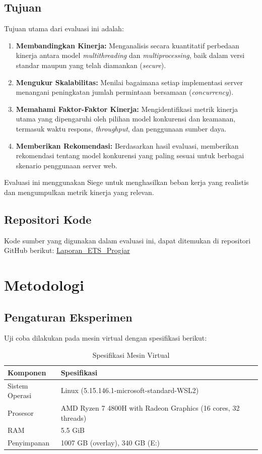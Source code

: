 \documentclass[12pt]{article}
\begin{document}
\subsection{Tujuan}

Tujuan utama dari evaluasi ini adalah:

\begin{enumerate}
    \item \textbf{Membandingkan Kinerja:} Menganalisis secara kuantitatif perbedaan kinerja antara model \textit{multithreading} dan \textit{multiprocessing}, baik dalam versi standar maupun yang telah diamankan (\textit{secure}).
    \item \textbf{Mengukur Skalabilitas:} Menilai bagaimana setiap implementasi server menangani peningkatan jumlah permintaan bersamaan (\textit{concurrency}).
    \item \textbf{Memahami Faktor-Faktor Kinerja:} Mengidentifikasi metrik kinerja utama yang dipengaruhi oleh pilihan model konkurensi dan keamanan, termasuk waktu respons, \textit{throughput}, dan penggunaan sumber daya.
    \item \textbf{Memberikan Rekomendasi:} Berdasarkan hasil evaluasi, memberikan rekomendasi tentang model konkurensi yang paling sesuai untuk berbagai skenario penggunaan server web.
\end{enumerate}

Evaluasi ini menggunakan Siege untuk menghasilkan beban kerja yang realistis dan mengumpulkan metrik kinerja yang relevan.

\subsection{Repositori Kode}

Kode sumber yang digunakan dalam evaluasi ini, dapat ditemukan di repositori GitHub berikut:
\href{https://github.com/daf2a/Laporan_ETS_Progjar}{Laporan\_ETS\_Progjar}

\newpage

\section{Metodologi}
\subsection{Pengaturan Eksperimen}
Uji coba dilakukan pada mesin virtual dengan spesifikasi berikut:

\begin{table}[h]
\centering
\caption{Spesifikasi Mesin Virtual}
\label{tab:vm_specs}
\begin{tabular}{|l|l|}
\hline
\textbf{Komponen} & \textbf{Spesifikasi} \\ \hline
Sistem Operasi & Linux (5.15.146.1-microsoft-standard-WSL2) \\ 
Prosesor & AMD Ryzen 7 4800H with Radeon Graphics (16 cores, 32 threads) \\
RAM & 5.5 GiB \\
Penyimpanan & 1007 GB (overlay), 340 GB (E:) \\
\hline
\end{tabular}
\end{table}
\end{document}
